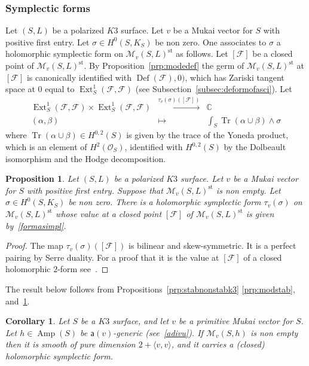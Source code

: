 \documentclass[11pt]{amsart}
\newcommand{\CC}{{\mathbb C}}
\let\mathcal\mathscr
\def\cF{\mathcal{F}}
\def\cM{\mathcal{M}}
\def\cO{\mathcal{O}}
\DeclareMathOperator{\Amp}{Amp}
\DeclareMathOperator{\Def}{Def}
\DeclareMathOperator{\Ext}{Ext}
\DeclareMathOperator{\st}{st}
\DeclareMathOperator{\Tr}{Tr}
\newcommand{\la}{\langle}
\newcommand{\ra}{\rangle}
\newtheorem{crl}[lmm]{Corollary}
\newtheorem{prp}[lmm]{Proposition}
\theoremstyle{definition}
\theoremstyle{remark}
\begin{document}
\subsubsection{Symplectic forms}
%
Let  $(S,L)$ be a polarized $K3$ surface.  Let $v$ be a Mukai vector for $S$ 
 with positive first entry.  Let $\sigma\in H^0(S,K_S)$ be  non zero. 
  One associates to $\sigma$ a holomorphic symplectic form  on  $\cM_v(S,L)^{\st}$ as follows. 
Let $[\cF]$ be a closed point of $\cM_v(S,L)^{\st}$. By  Proposition~\ref{prp:modedef} the germ of $\cM_v(S,L)^{\st}$ at $[\cF]$ is canonically identified with $\Def(\cF),0)$, which has Zariski tangent space at $0$ equal to $\Ext^1_S(\cF,\cF)$ (see 
Subsection~\ref{subsec:deformofasci}). Let
%
\begin{equation}\label{formasimpl}
%
\begin{matrix}
%
\Ext^1_S(\cF,\cF)\times \Ext^1_S(\cF,\cF) & \xrightarrow{\tau_v(\sigma)([\cF])} & \CC \\
%
(\alpha,\beta) & \mapsto & \int_S \Tr(\alpha\cup\beta)\wedge\sigma
%
\end{matrix}
%
\end{equation}
%
where $\Tr(\alpha\cup\beta)\in H^{0,2}(S)$ is given by the trace of the Yoneda product, which is an element of $H^2(\cO_S)$, identified with
$H^{0,2}(S)$ by the Dolbeault isomorphism and the Hodge decomposition.   
%
\begin{prp}\label{prp:modsimpl}
%
Let  $(S,L)$ be a polarized $K3$ surface.  Let $v$ be a Mukai vector for $S$ 
 with positive first entry. Suppose that  $\cM_v(S,L)^{\st}$ is non empty. Let $\sigma\in H^0(S,K_S)$ be  non zero. There is a holomorphic symplectic form  $\tau_v(\sigma)$ on  $\cM_v(S,L)^{\st}$ whose value at 
 a closed point $[\cF]$ of $\cM_v(S,L)^{\st}$ is given by~\eqref{formasimpl}.
%
\end{prp}
%
%
\begin{proof}
%
The map $\tau_v(\sigma)([\cF])$ is bilinear and skew-symmetric. It is   a perfect pairing by Serre duality. For  a proof that it is the value at $[\cF]$ of a closed holomorphic $2$-form see~\cite{og:santacruz}.
%
\end{proof}
%
The result below follows from Propositions~\ref{prp:stabnonstabk3} \ref{prp:modstab}, and~\ref{prp:modsimpl}.
%
\begin{crl}\label{crl:stabnonstabk3}
%
Let $S$ be a $K3$ surface, and let $v$ be a primitive 
Mukai vector for $S$. Let $h\in\Amp(S)$ be ${\mathsf a}(v)$-generic  (see~\eqref{adivu}). If $\cM_v(S,h)$ is non empty
then it is smooth of pure dimension $2+\la v,v\ra$, and it carries a (closed) holomorphic symplectic form.
%
\end{crl}
%
%
\end{document}
